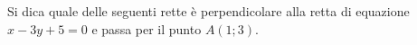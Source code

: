 Si dica quale delle seguenti rette è perpendicolare 
alla retta di equazione \( \displaystyle x-3y+5=0\) e passa per il punto 
\( \displaystyle A\left(1;3\right)\). 